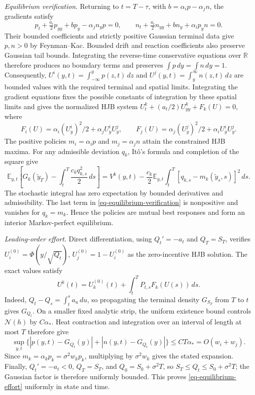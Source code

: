 \documentclass[mnsc]{informs3}
\begin{document}
\begin{APPENDICES}
{{\emph{Equilibrium verification.}
Returning to $t=T-\tau$, with $b=\alpha_ip-\alpha_jn$,
the gradients satisfy
\[
p_t+\tfrac{a_t}2p_{yy}+bp_y-\alpha_jn_yp=0,\qquad
n_t+\tfrac{a_t}2n_{yy}+bn_y+\alpha_ip_yn=0.
\]
Their bounded coefficients and strictly positive Gaussian terminal data
give $p,n>0$ by Feynman--Kac. Bounded drift and reaction
coefficients also preserve Gaussian tail bounds. Integrating the
reverse-time conservative equations over $\mathbb R$ therefore produces
no boundary terms and preserves $\int p\,dy=\int n\,dy=1$.
Consequently,
$U^i(y,t)=\int_{-\infty}^yp(z,t)\,dz$ and
$U^j(y,t)=\int_y^\infty n(z,t)\,dz$
are bounded values with the required terminal and spatial limits.
Integrating the gradient equations fixes the possible constants of
integration by these spatial limits and gives the normalized HJB system
$U_t^k+(a_t/2)U_{yy}^k+F_k(U)=0$, where
\[
F_i(U)=\alpha_i(U_y^i)^2/2+\alpha_jU_y^iU_y^j,\qquad
F_j(U)=\alpha_j(U_y^j)^2/2+\alpha_iU_y^iU_y^j.
\]
The positive policies $m_i=\alpha_ip$ and $m_j=\alpha_jn$ attain
the constrained HJB maxima. For any admissible deviation $q_k$,
It\^o's formula and completion of the square give
\begin{equation}\label{eq-equilibrium-verification}
\mathbb E_{y,t}\!\left[G_k(\tilde y_T)-\int_t^T
\frac{c_kq_{k,s}^2}{2}\,ds\right]
=V^k(y,t)-\frac{c_k}{2}\mathbb E_{y,t}\!\int_t^T
[q_{k,s}-m_k(\tilde y_s,s)]^2\,ds.
\end{equation}
The stochastic integral has zero expectation by bounded derivatives
and admissibility.
The last term in \eqref{eq-equilibrium-verification} is nonpositive and
vanishes for $q_k=m_k$. Hence the policies are mutual best responses and
form an interior Markov-perfect equilibrium.

\emph{Leading-order effort.}
Direct differentiation, using $Q_t'=-a_t$ and $Q_T=S_T$, verifies
$U_i^{(0)}=\Phi(y/\sqrt{Q_t})$, $U_j^{(0)}=1-U_i^{(0)}$
as the zero-incentive HJB solution. The exact values satisfy
\begin{equation}\label{eq-equilibrium-fixed-point}
U^k(t)=U_k^{(0)}(t)+\int_t^T P_{t,s}F_k(U(s))\,ds.
\end{equation}
Indeed, $Q_t-Q_s=\int_t^sa_u\,du$, so propagating the terminal density
$G_{S_T}$ from $T$ to $t$ gives $G_{Q_t}$. On a smaller fixed analytic
strip, the uniform existence bound controls $\mathcal N(h)$ by
$C\alpha_*$. Heat contraction and integration over an interval of length
at most $T$ therefore give
\[
\sup_{y,t}\{|p(y,t)-G_{Q_t}(y)|+|n(y,t)-G_{Q_t}(y)|\}
\leq CT\alpha_*=O(w_i+w_j).
\]
Since $m_k=\alpha_kp_k=\sigma^2w_kp_k$, multiplying by
$\sigma^2w_k$ gives the stated expansion. Finally,
$Q_t'=-a_t<0$, $Q_T=S_T$, and $Q_0=S_0+\sigma^2T$, so
$S_T\leq Q_t\leq S_0+\sigma^2T$; the Gaussian factor is therefore
uniformly bounded. This proves \eqref{eq-equilibrium-effort} uniformly
in state and time.
\Halmos
\endproof
}
}


\end{APPENDICES}
\end{document}
